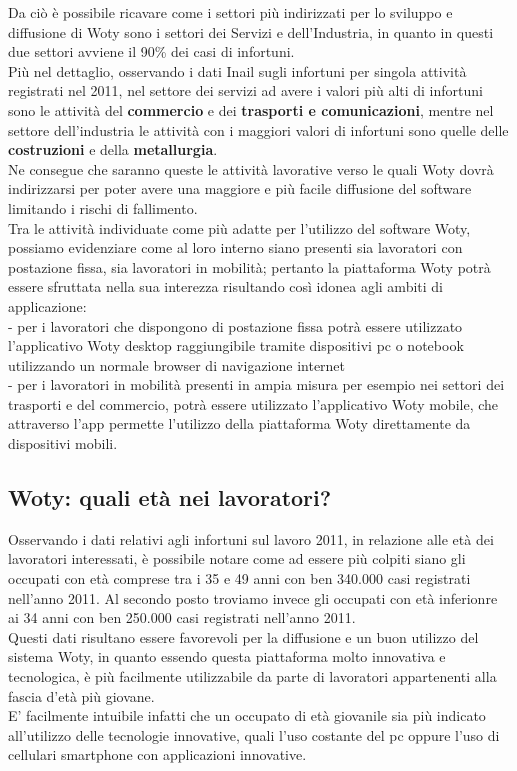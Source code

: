 Da ciò è possibile ricavare come i settori più indirizzati per lo sviluppo e diffusione di Woty sono i settori dei Servizi e dell'Industria, in quanto in questi due settori avviene il 90\% dei casi di infortuni.\\
Più nel dettaglio, osservando i dati Inail sugli infortuni per singola attività registrati nel 2011, nel settore dei servizi ad avere i valori più alti di infortuni sono le attività del \textbf{commercio} e dei \textbf{trasporti e comunicazioni}, mentre nel settore dell'industria le attività con i maggiori valori di infortuni sono quelle delle \textbf{costruzioni} e della \textbf{metallurgia}.\\
Ne consegue che saranno queste le attività lavorative verso le quali Woty dovrà indirizzarsi per poter avere una maggiore e più facile diffusione del software limitando i rischi di fallimento.\\


Tra le attività individuate come più adatte per l'utilizzo del software Woty, possiamo evidenziare come al loro interno siano presenti sia lavoratori con postazione fissa, sia lavoratori in mobilità; pertanto la piattaforma Woty potrà essere sfruttata nella sua interezza risultando così idonea agli ambiti di applicazione:\\
- per i lavoratori che dispongono di postazione fissa potrà essere utilizzato l'applicativo Woty desktop raggiungibile tramite dispositivi pc o notebook utilizzando un normale browser di navigazione internet\\
- per i lavoratori in mobilità presenti in ampia misura per esempio nei settori dei trasporti e del commercio, potrà essere utilizzato l'applicativo Woty mobile, che attraverso l'app permette l'utilizzo della piattaforma Woty direttamente da dispositivi mobili.



\subsection{Woty: quali età nei lavoratori?}
Osservando i dati relativi agli infortuni sul lavoro 2011, in relazione alle età dei lavoratori interessati, è possibile notare come ad essere più colpiti siano gli occupati con età comprese tra i 35 e 49 anni con ben 340.000 casi registrati nell'anno 2011.
Al secondo posto troviamo invece gli occupati con età inferionre ai 34 anni con ben 250.000 casi registrati nell'anno 2011.\\
Questi dati risultano essere favorevoli per la diffusione e un buon utilizzo del sistema Woty, in quanto essendo questa piattaforma molto innovativa e tecnologica, è più facilmente utilizzabile da parte di lavoratori appartenenti alla fascia d'età più giovane.\\
E' facilmente intuibile infatti che un occupato di età giovanile sia più indicato all'utilizzo delle tecnologie innovative, quali l'uso costante del pc oppure l'uso di cellulari smartphone con applicazioni innovative.




